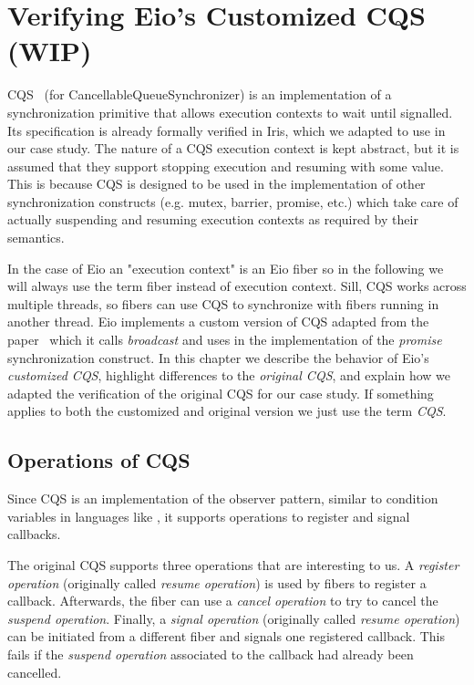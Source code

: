 \section{Verifying Eio's Customized CQS (WIP)}
\label{sec:cqs}


CQS~\cite{koval2023cqs} (for CancellableQueueSynchronizer) is an implementation of a synchronization primitive that allows execution contexts to wait until signalled.
Its specification is already formally verified in Iris, which we adapted to use in our case study.
The nature of a CQS execution context is kept abstract, but it is assumed that they support stopping execution and resuming with some value.
This is because CQS is designed to be used in the implementation of other synchronization constructs (e.g. mutex, barrier, promise, etc.) which take care of actually suspending and resuming execution contexts as required by their semantics.


In the case of Eio an "execution context" is an Eio fiber so in the following we will always use the term fiber instead of execution context.
Sill, CQS works across multiple threads, so fibers can use CQS to synchronize with fibers running in another thread.
Eio implements a custom version of CQS adapted from the paper~\cite{koval2023cqs} which it calls \emph{broadcast} and uses in the implementation of the \emph{promise} synchronization construct.
In this chapter we describe the behavior of Eio's \emph{customized CQS}, highlight differences to the \emph{original CQS}, and explain how we adapted the verification of the original CQS for our case study.
If something applies to both the customized and original version we just use the term \emph{CQS}.

\subsection{Operations of CQS}
\label{sec:cqs-operations}

Since CQS is an implementation of the observer pattern, similar to condition variables in languages like \CC{}, it supports operations to register and signal callbacks.


The original CQS supports three operations that are interesting to us.
A \emph{register operation} (originally called \emph{resume operation}) is used by fibers to register a callback.
Afterwards, the fiber can use a \emph{cancel operation} to try to cancel the \emph{suspend operation}.
Finally, a \emph{signal operation} (originally called \emph{resume operation}) can be initiated from a different fiber and signals one registered callback.
This fails if the \emph{suspend operation} associated to the callback had already been cancelled.

